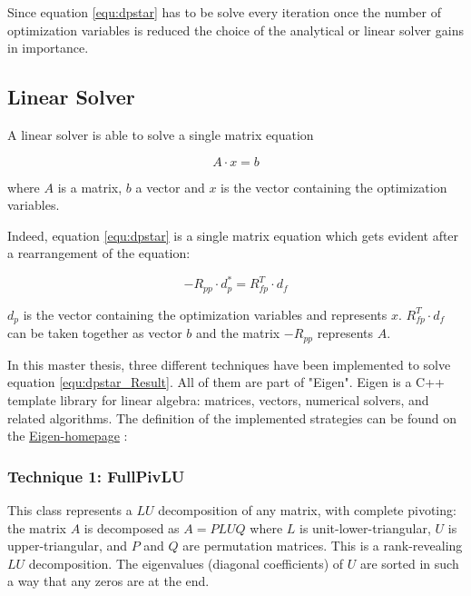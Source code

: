 Since equation \ref{equ:dpstar} has to be solve every iteration once the number of optimization variables is reduced the choice of the analytical or linear solver gains in importance.

\subsection{Linear Solver}

A linear solver is able to solve a single matrix equation

\begin{equation}
A \cdot x = b
\label{equ:linearSolver}
\end{equation}

where $A$ is a matrix, $b$ a vector and $x$ is the vector containing the optimization variables. \newline

Indeed, equation \ref{equ:dpstar} is a single matrix equation which gets evident after a rearrangement of the equation:

\begin{equation}
 - R_{pp}  \cdot d_p^* =R_{fp}^T \cdot d_f
\label{equ:dpstar_Result}
\end{equation}

$d_p$  is the vector containing the optimization variables and represents $x$. $R_{fp}^T \cdot d_f$ can be taken together as vector $b$ and the matrix $-R_{pp}$ represents $A$. \newline

In this master thesis, three different techniques have been implemented to solve equation \ref{equ:dpstar_Result}.
All of them are part of "Eigen". Eigen is a C++ template library for linear algebra: matrices, vectors, numerical solvers, and related algorithms. The definition of the implemented strategies can be found on the  \href{http://eigen.tuxfamily.org/index.php?title=Main_Page}{Eigen-homepage} \cite{Eigen}:

\subsubsection{Technique 1: FullPivLU}

This class represents a $LU$ decomposition of any matrix, with complete pivoting: the matrix $A$ is decomposed as $A = PLUQ$ where $L$ is unit-lower-triangular, $U$ is upper-triangular, and $P$ and $Q$ are permutation matrices. This is a rank-revealing $LU$ decomposition. The eigenvalues (diagonal coefficients) of $U$ are sorted in such a way that any zeros are at the end. \newline

